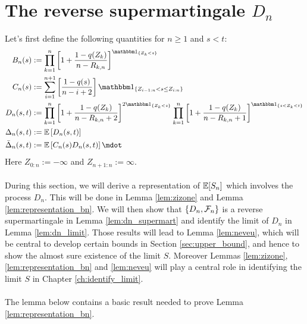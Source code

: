 \section{The reverse supermartingale $D_n$} \label{sec:dn}
Let's first define the following quantities for $n\geq 1$ and $s < t$:
\begin{align*}
	B_n(s) &:= \prod_{k=1}^{n}\left[1+\frac{1-q(Z_{k})}{n-R_{k,n}}\right]^{\I{Z_{k} < s}}\\
	C_n(s) &:= \sum_{i=1}^{n+1}\left[\frac{1-q(s)}{n-i+2}\right]\I{Z_{i-1:n} < s \leq Z_{i:n}}\\
	D_n(s,t) &:= \prod_{k=1}^{n} \left[1+\frac{1-q(Z_k)}{n-R_{k,n} +2}\right]^{2\I{Z_k<s}} \prod_{k=1}^{n}\left[1+\frac{1-q(Z_k)}{n-R_ {k,n}+1}\right]^{\I{s < Z_k < t}}\\
	\Delta_n(s,t) &:= \E\left[D_n(s,t) \right]\\
	\bar{\Delta}_n(s,t) &:= \E\left[C_n(s)D_n(s,t) \right]\mdot
\end{align*}
Here $Z_{0:n} := -\infty$ and $Z_{n+1:n} := \infty$.\\
\\
During this section, we will derive a representation of $\mathbb{E}[S_n]$ which involves the process $D_n$. This will be done in Lemma \ref{lem:zizone} and Lemma \ref{lem:representation_bn}. We will then show that $\{D_n,\mathcal{F}_n\}$ is a reverse supermartingale in Lemma \ref{lem:dn_supermart} and identify the limit of $D_n$ in Lemma \ref{lem:dn_limit}. Those results will lead to Lemma \ref{lem:neveu}, which will be central to develop certain bounds in Section \ref{sec:upper_bound}, and hence to show the almost sure existence of the limit $S$. Moreover Lemmas \ref{lem:zizone}, \ref{lem:representation_bn} and \ref{lem:neveu} will play a central role in identifying the limit $S$ in Chapter \ref{ch:identify_limit}.\\
\\
The lemma below contains a basic result needed to prove Lemma \ref{lem:representation_bn}.
